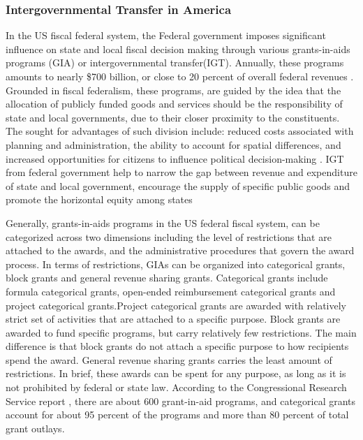 \subsubsection{Intergovernmental Transfer in America}
In the US fiscal federal system, the Federal government imposes significant influence on state and local fiscal decision making through various grants-in-aids programs (GIA) or intergovernmental transfer(IGT). Annually, these programs amounts to nearly \$700 billion, or close to 20 percent of overall federal revenues \cite{dilger2015federal}. Grounded in fiscal federalism, these programs, are guided by the idea that the allocation of publicly funded goods and services should be the responsibility of state and local governments, due to their closer proximity to the constituents. The sought for advantages of such division include: reduced costs associated with planning and administration, the ability to account for spatial differences, and increased opportunities for citizens to influence political decision-making \cite{musgrave1997devolution}. IGT from federal government help to narrow the gap between revenue and expenditure of state and local government, encourage the supply of specific public goods and promote the horizontal equity among states

Generally, grants-in-aids programs in the US federal fiscal system, can be categorized across two dimensions including the level of restrictions that are attached to the awards, and the administrative procedures that govern the award process. In terms of restrictions, GIAs can be organized into categorical grants, block grants and general revenue sharing grants. Categorical grants include formula categorical grants, open-ended reimbursement categorical grants and project categorical grants.Project categorical grants are awarded with relatively strict set of activities that are attached to a specific purpose. Block grants are awarded to fund specific programs, but carry relatively few restrictions. The main difference is that block grants do not attach a specific purpose to how recipients spend the award. General revenue sharing grants carries the least amount of restrictions. In brief, these awards can be spent for any purpose, as long as it is not prohibited by federal or state law.  According to the Congressional Research Service report \cite{dilger2015federal}, there are about 600 grant-in-aid programs, and categorical grants account for about 95 percent of the programs and more than 80 percent of total grant outlays. 

